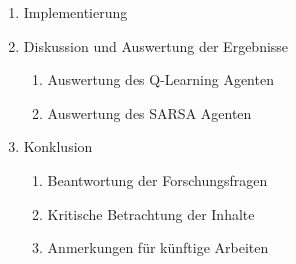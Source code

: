 \begin{enumerate}
\begin{enumerate}
        \item Agent Q-Learning
        \item Agent SARSA
        \item Trainingsaufbau und Evaluationsmetriken
        \end{enumerate}
    \item Implementierung
    \item Diskussion und Auswertung der Ergebnisse
        \begin{enumerate}
        \item Auswertung des Q-Learning Agenten
        \item Auswertung des SARSA Agenten
        \end{enumerate}
    \item Konklusion
        \begin{enumerate}
        \item Beantwortung der Forschungsfragen
        \item Kritische Betrachtung der Inhalte
        \item Anmerkungen für künftige Arbeiten
        \end{enumerate}   
\end{enumerate}

